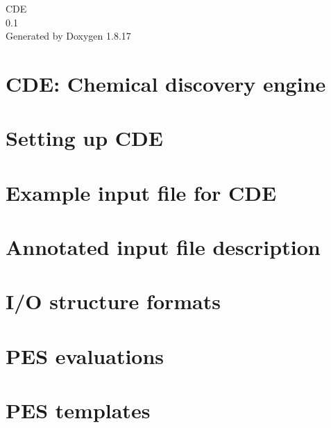 \let\mypdfximage\pdfximage\def\pdfximage{\immediate\mypdfximage}\documentclass[twoside]{book}
\newcommand{\+}{\discretionary{\mbox{\scriptsize$\hookleftarrow$}}{}{}}
\newcommand{\clearemptydoublepage}{%
  \newpage{\pagestyle{empty}\cleardoublepage}%
}
\begin{document}
\hypersetup{pageanchor=false,
             bookmarksnumbered=true,
             pdfencoding=unicode
            }
\begin{titlepage}
\vspace*{7cm}
\begin{center}%
{\Large C\+DE \\[1ex]\large 0.\+1 }\\
\vspace*{1cm}
{\large Generated by Doxygen 1.8.17}\\
\end{center}
\end{titlepage}
\clearemptydoublepage
{}
\tableofcontents
\clearemptydoublepage
{}
\hypersetup{pageanchor=true}

\chapter{C\+DE\+: Chemical discovery engine}
\label{index}\hypertarget{index}{}
\chapter{Setting up C\+DE}
\label{setup}

\chapter{Example input file for C\+DE}
\label{_example}

\chapter{Annotated input file description}
\label{_annotated}

\chapter{I/O structure formats}
\label{formats}

\chapter{P\+ES evaluations}
\label{_p_e_s}

\chapter{P\+ES templates}
\label{_templates}

\end{document}
